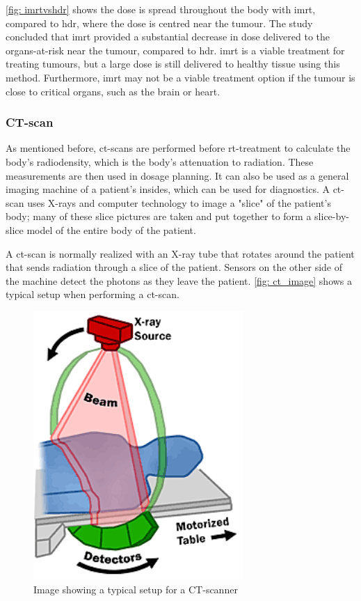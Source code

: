 \documentclass[main.tex]{subfiles}
\begin{document}
\autoref{fig: imrtvshdr} shows the dose is spread throughout the body with \gls{imrt}, compared to \gls{hdr}, where the dose is centred near the tumour. The study concluded that \gls{imrt} provided a substantial decrease in dose delivered to the organs-at-risk near the tumour, compared to \gls{hdr}\cite{imrtVShdr}. \gls{imrt} is a viable treatment for treating tumours, but a large dose is still delivered to healthy tissue using this method. Furthermore, \gls{imrt} may not be a viable treatment option if the tumour is close to critical organs, such as the brain or heart.

\subsubsection{CT-scan}
As mentioned before, \gls{ct}-scans are performed before \gls{rt}-treatment to calculate the body's radiodensity, which is the body's attenuation to radiation. These measurements are then used in dosage planning. It can also be used as a general imaging machine of a patient's insides, which can be used for diagnostics. A \gls{ct}-scan uses X-rays and computer technology to image a "slice" of the patient's body; many of these slice pictures are taken and put together to form a slice-by-slice model of the entire body of the patient.

A \gls{ct}-scan is normally realized with an X-ray tube that rotates around the patient that sends radiation through a slice of the patient. Sensors on the other side of the machine detect the photons as they leave the patient. \autoref{fig: ct_image} shows a typical setup when performing a \gls{ct}-scan.

 \begin{figure}[!htpb]
    \centering
    \includegraphics[width=8cm ]{images/CTXRAYScan.png}
    \caption{Image showing a typical setup for a CT-scanner\cite{CTimage}}
    \label{fig: ct_image}
\end{figure}
\FloatBarrier 
\end{document}
